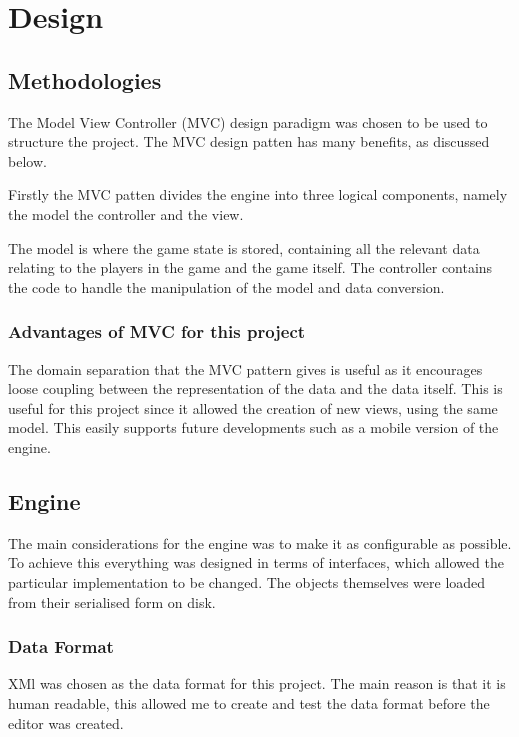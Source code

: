 \section{Design}

\subsection{Methodologies}
\label{sub:methodologies}
The Model View Controller (MVC) design paradigm was chosen to be used to structure the project. The MVC design patten has many benefits, as discussed below.  

Firstly the MVC patten divides the engine into three logical components, namely the model the controller and the view.  

The model is where the game state is stored, containing all the relevant data relating to the players in the game and the game itself.  The controller contains the code to handle  the manipulation of the model and data conversion.

\subsubsection{Advantages of MVC for this project}
\label{ssub:advantages_of_mvc_for_this_project}

The domain separation that the MVC pattern gives is useful as it encourages loose coupling between the representation of the data and the data itself. This is useful for this project since it allowed the creation of new views, using the same model. This easily supports future developments such as a mobile version of the engine.

\subsection{Engine}
The main considerations  for the engine was to make it as configurable as possible. To achieve this everything was designed in terms of interfaces, which allowed the particular implementation to be changed. The objects themselves were loaded from their serialised form on disk. 

\subsubsection{Data Format}
\label{ssub:data_format}
XMl was chosen as the data format for this project. The main reason is that it is human readable, this allowed me to create and test the data format before the editor was created.

